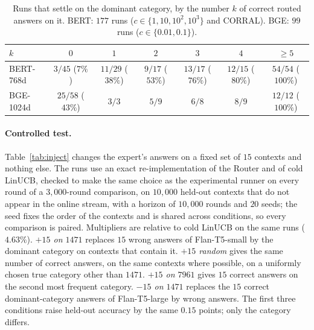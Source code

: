 \documentclass{article}
\theoremstyle{definition}
\theoremstyle{remark}
\theoremstyle{remark}
\begin{document}
\begin{table}[h]
\centering
\caption{Runs that settle on the dominant category, by the number $k$ of
correct routed answers on it. BERT: $177$ runs ($c\in\{1,10,10^2,10^3\}$ and
CORRAL). BGE: $99$ runs ($c\in\{0.01,0.1\}$).}
\label{tab:dose}
\small
\begin{tabular}{@{}lcccccc@{}}
\toprule
$k$ & $0$ & $1$ & $2$ & $3$ & $4$ & $\ge5$ \\
\midrule
BERT-768d & $3/45$ ($7\%$) & $11/29$ ($38\%$) & $9/17$ ($53\%$) & $13/17$ ($76\%$) & $12/15$ ($80\%$) & $54/54$ ($100\%$) \\
BGE-1024d & $25/58$ ($43\%$) & $3/3$ & $5/9$ & $6/8$ & $8/9$ & $12/12$ ($100\%$) \\
\bottomrule
\end{tabular}
\end{table}

\paragraph{Controlled test.}
Table~\ref{tab:inject} changes the expert's answers on a fixed set of $15$
contexts and nothing else. The runs use an exact re-implementation of the
Router and of cold LinUCB, checked to make the same choice as the
experimental runner on every round of a $3{,}000$-round comparison, on
$10{,}000$ held-out contexts that do not appear in the online stream, with a
horizon of $10{,}000$ rounds and $20$ seeds; the seed fixes the order of the
contexts and is shared across conditions, so every comparison is paired.
Multipliers are relative to cold LinUCB on the same runs ($4.63\%$).
\emph{$+15$ on $1471$} replaces $15$ wrong answers of Flan-T5-small by the
dominant category on contexts that contain it. \emph{$+15$ random} gives the
same number of correct answers, on the same contexts where possible, on a
uniformly chosen true category other than $1471$. \emph{$+15$ on $7961$}
gives $15$ correct answers on the second most frequent category.
\emph{$-15$ on $1471$} replaces the $15$ correct dominant-category answers of
Flan-T5-large by wrong answers. The first three conditions raise held-out
accuracy by the same $0.15$ points; only the category differs.
\end{document}
